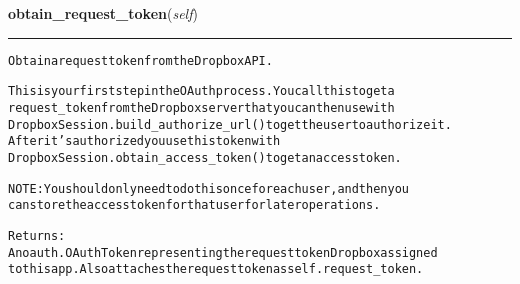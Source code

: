     \label{lib:dropbox:DropboxSession:obtain_request_token}

    \vspace{0.5ex}

\hspace{.8\funcindent}\begin{boxedminipage}{\funcwidth}

    \raggedright \textbf{obtain\_request\_token}(\textit{self})

    \vspace{-1.5ex}

    \rule{\textwidth}{0.5\fboxrule}
\setlength{\parskip}{2ex}
\begin{alltt}
Obtain a request token from the Dropbox API.

This is your first step in the OAuth process.  You call this to get a
request\_token from the Dropbox server that you can then use with
DropboxSession.build\_authorize\_url() to get the user to authorize it.
After it's authorized you use this token with
DropboxSession.obtain\_access\_token() to get an access token.

NOTE:  You should only need to do this once for each user, and then you
can store the access token for that user for later operations.

Returns:
    An oauth.OAuthToken representing the request token Dropbox assigned
    to this app. Also attaches the request token as self.request\_token.
\end{alltt}

\setlength{\parskip}{1ex}
    \end{boxedminipage}

    \label{lib:dropbox:DropboxSession:obtain_access_token}

    \vspace{0.5ex}

